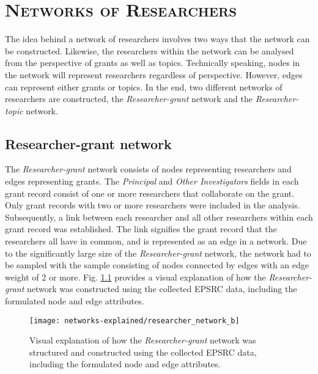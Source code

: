 \chapter{\textsc{Networks of Researchers}}
\label{chapter:networks_of_researchers}

The idea behind a network of researchers involves two ways that the network can be constructed. Likewise, the researchers within the network can be analysed from the perspective of grants as well as topics. Technically speaking, nodes in the network will represent researchers regardless of perspective. However, edges can represent either grants or topics. In the end, two different networks of researchers are constructed, the \textit{Researcher-grant} network and the \textit{Researcher-topic} network.

\section{Researcher-grant network}

The \textit{Researcher-grant} network consists of nodes representing researchers and edges representing grants. The \textit{Principal} and \textit{Other Investigators} fields in each grant record consist of one or more researchers that collaborate on the grant. Only grant records with two or more researchers were included in the analysis. Subsequently, a link between each researcher and all other researchers within each grant record was established. The link signifies the grant record that the researchers all have in common, and is represented as an edge in a network. Due to the significantly large size of the \textit{Researcher-grant} network, the network had to be sampled with the sample consisting of nodes connected by edges with an edge weight of 2 or more. Fig. \ref{figure:researcher_b_structure} provides a visual explanation of how the \textit{Researcher-grant} network was constructed using the collected EPSRC data, including the formulated node and edge attributes.

\begin{figure}[htpb]
    \centering
    \texttt{[image: networks-explained/researcher\_network\_b]}
    \caption[Visual explanation of how the \textit{Researcher-grant} network was structured and constructed using the collected EPSRC data]{Visual explanation of how the \textit{Researcher-grant} network was structured and constructed using the collected EPSRC data, including the formulated node and edge attributes.}
    \label{figure:researcher_b_structure}
\end{figure}

